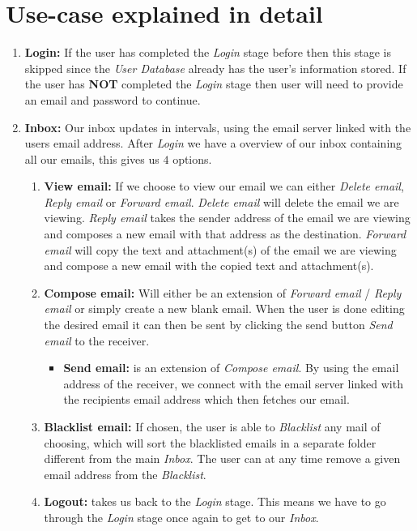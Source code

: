 \documentclass{article}
\begin{document}
\newpage

\section*{Use-case explained in detail} 
\renewcommand{\labelenumii}{\arabic{enumi}.\arabic{enumii}}
\begin{enumerate} 
    \item \textbf{Login:} If the user has completed the \textit{Login} stage before then this stage is skipped since the \textit{User Database} already has the user's information stored. If the user has \textbf{NOT} completed the \textit{Login} stage then user will need to provide an email and password to continue.
    \item \textbf{Inbox:} Our inbox updates in intervals, using the email server linked with the users email address. After \textit{Login} we have a overview of our inbox containing all our emails, this gives us $4$ options.
    \begin{enumerate}
        \item \textbf{View email:} If we choose to view our email we can either \textit{Delete email}, \textit{Reply email} or \textit{Forward email}. \textit{Delete email} will delete the email we are viewing. \textit{Reply email} takes the sender address of the email we are viewing and composes a new email with that address as the destination. \textit{Forward email} will copy the text and attachment(s) of the email we are viewing and compose a new email with the copied text and attachment(s). 
        \item \textbf{Compose email:} Will either be an extension of \textit{Forward email} / \textit{Reply email} or simply create a new blank email. When the user is done editing the desired email it can then be sent by clicking the send button \textit{Send email} to the receiver.
        \begin{itemize}
            \item \textbf{Send email:} is an extension of \textit{Compose email}. By using the email address of the receiver, we connect with the email server linked with the recipients email address which then fetches our email. 
        \end{itemize}
        \item \textbf{Blacklist email:} If chosen, the user is able to \textit{Blacklist} any mail of choosing, which will sort the blacklisted emails in a separate folder different from the main \textit{Inbox}. The user can at any time remove a given email address from the \textit{Blacklist}.
        \item \textbf{Logout:} takes us back to the \textit{Login} stage. This means we have to go through the \textit{Login} stage once again to get to our \textit{Inbox}.
    \end{enumerate}
    
\end{enumerate}
\end{document}
